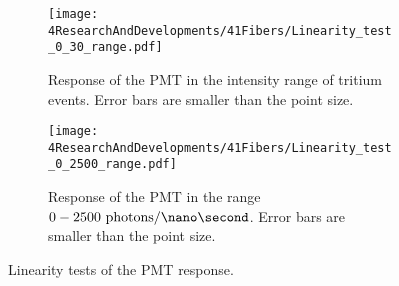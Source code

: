 \begin{figure}
\centering
    \begin{subfigure}[b]{1\textwidth}
    \centering
    \texttt{[image: 4ResearchAndDevelopments/41Fibers/Linearity\_test\_0\_30\_range.pdf]}  
    \caption{Response of the PMT in the intensity range of tritium events. Error bars are smaller than the point size. \label{subfig:LinearityTritiumRange}}
    \end{subfigure}
    \hfill
    \begin{subfigure}[b]{1\textwidth}
    \centering
    \texttt{[image: 4ResearchAndDevelopments/41Fibers/Linearity\_test\_0\_2500\_range.pdf]}  
    \caption{Response of the PMT in the range $0-2500~\text{photons}/\nano\second$. Error bars are smaller than the point size. \label{subfig:LinearityStudyRange}}
    \end{subfigure}
 \caption{Linearity tests of the PMT response.}
 \label{fig:LinearityRangesOfPMT}
\end{figure}